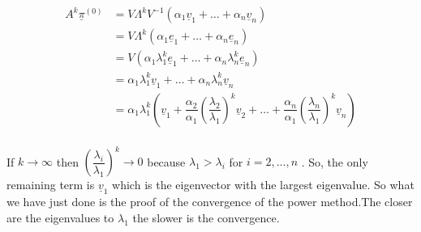     \begin{align*}
                A^k \underline{\pi}^{(0)} &= V\Lambda^k V^{-1} \left(\alpha_1\underline{v}_1 + \dots + \alpha_n\underline{v}_n\right)\\
        &= V\Lambda^k \left(\alpha_1\underline{e}_1 + \dots + \alpha_n\underline{e}_n\right)\\
        &= V\left(\alpha_1\lambda_1^k\underline{e}_1 + \dots + \alpha_n\lambda_n^k\underline{e}_n \right)\\
        &=\alpha_1\lambda_1^k\underline{v}_1 + \dots + \alpha_n\lambda_n^k\underline{v}_n\\ 
        &= \alpha_1\lambda_1^k \left(\underline{v}_1 + \dfrac{\alpha_2}{\alpha_1}\left(\dfrac{\lambda_2}{\lambda_1}\right)^k \underline{v}_2 + \dots + \dfrac{\alpha_n}{\alpha_1}\left(\dfrac{\lambda_n}{\lambda_1}\right)^k \underline{v}_n\right)\\
\end{align*}


If $k \to \infty$ then $\left(\dfrac{\lambda_i}{\lambda_1}\right)^k \to 0$ because $\lambda_1 > \lambda_i$ for $i = 2, \dots, n$ . So, the only remaining term is $\underline{v}_1$ which is the eigenvector with the largest eigenvalue. So what we have just done is the proof of the convergence of the power method.The closer are the eigenvalues to $\lambda_1$ the slower is the convergence.